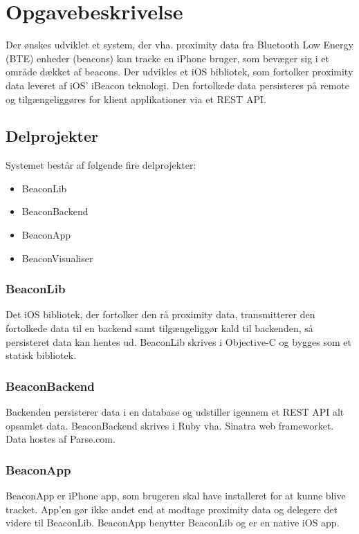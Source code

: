 \chapter{Opgavebeskrivelse}

Der ønskes udviklet et system, der vha. proximity data fra Bluetooth Low Energy (BTE) enheder (beacons) kan tracke en iPhone bruger, som bevæger sig i et område dækket af beacons. Der udvikles et iOS bibliotek, som fortolker proximity data leveret af iOS' iBeacon teknologi. Den fortolkede data persisteres på remote og tilgængeliggøres for klient applikationer via et REST API.

\section{Delprojekter}
Systemet består af følgende fire delprojekter:

\begin{itemize}
	\item BeaconLib
	\item BeaconBackend
	\item BeaconApp
	\item BeaconVisualiser
\end{itemize}

\subsection{BeaconLib}
Det iOS bibliotek, der fortolker den rå proximity data, transmitterer den fortolkede data til en backend samt tilgængeliggør kald til backenden, så persisteret data kan hentes ud. BeaconLib skrives i Objective-C og bygges som et statisk bibliotek.

\subsection{BeaconBackend}
Backenden persisterer data i en database og udstiller igennem et REST API alt opsamlet data. BeaconBackend skrives i Ruby vha. Sinatra web frameworket. Data hostes af Parse.com.

\subsection{BeaconApp}
BeaconApp er iPhone app, som brugeren skal have installeret for at kunne blive tracket. App'en gør ikke andet end at modtage proximity data og delegere det videre til BeaconLib. BeaconApp benytter BeaconLib og er en native iOS app.

